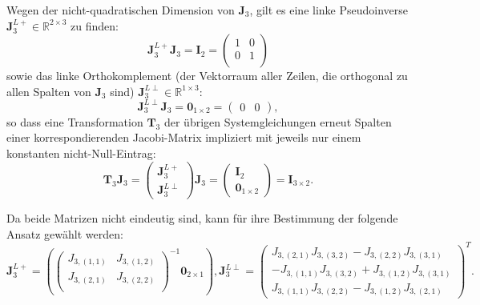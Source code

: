 Wegen der nicht-quadratischen Dimension von $\mathbf{J}_3$, gilt es eine linke Pseudoinverse $\mathbf{J}_3^{L+} \in \mathbb{R}^{2 \times 3}$ zu finden:
\begin{equation}
	\mathbf{J}_3^{L+} \mathbf{J}_3 = \mathbf{I}_{2} = 
	\left(\begin{matrix}
	1 & 0\\
	0 & 1\\
	\end{matrix}\right)	
\end{equation}
sowie das linke Orthokomplement (der Vektorraum aller Zeilen, die orthogonal zu allen Spalten von $\mathbf{J}_3$ sind) $\mathbf{J}_3^{L\perp} \in \mathbb{R}^{1 \times 3}$:
\begin{equation}
	\mathbf{J}_3^{L\perp} \mathbf{J}_3 = \mathbf{0}_{1 \times 2} = 
	\left(\begin{matrix}
	0 & 0
	\end{matrix}\right),
\end{equation}
so dass eine Transformation $\mathbf{T}_3$ der übrigen Systemgleichungen erneut Spalten einer korrespondierenden Jacobi-Matrix impliziert mit jeweils nur einem konstanten nicht-Null-Eintrag:
\begin{equation}
	\mathbf{T}_3 \mathbf{J}_3 =
	\left(\begin{matrix}
		\mathbf{J}_3^{L+} \\
		\mathbf{J}_3^{L \perp}
	\end{matrix}\right)
	\mathbf{J}_3 =
	\left(\begin{matrix}
		\mathbf{I}_{2} \\
		\mathbf{0}_{1 \times 2}
	\end{matrix}\right)
	=
	\mathbf{I}_{3 \times 2}. 
\end{equation}

Da beide Matrizen nicht eindeutig sind, kann für ihre Bestimmung der folgende Ansatz gewählt werden: 
\begin{equation}
	\mathbf{J}_3^{L+} =
	\left(
	\left(\begin{matrix}
		J_{3, (1,1)} & J_{3, (1,2)}\\
		J_{3, (2,1)} & J_{3, (2,2)}\\
	\end{matrix}\right)^{-1}	
	\mathbf{0}_{2 \times 1}
	\right), 		
	\mathbf{J}_3^{L\perp} =
	\left(\begin{matrix}
		J_{3, (2,1)} J_{3, (3,2)} - J_{3, (2,2)} J_{3, (3,1)} \\
		-J_{3, (1,1)} J_{3, (3,2)} + J_{3, (1,2)} J_{3, (3,1)} \\
		J_{3, (1,1)} J_{3, (2,2)} - J_{3, (1,2)} J_{3, (2,1)}
	\end{matrix}\right)^T.
\end{equation}

